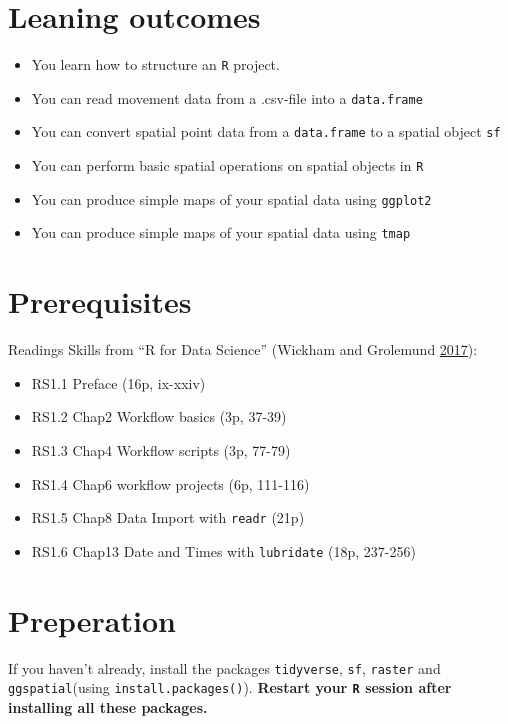 \documentclass[]{book}
\providecommand{\tightlist}{%
  \setlength{\itemsep}{0pt}\setlength{\parskip}{0pt}}
\begin{document}
\hypertarget{leaning-outcomes}{%
\section{Leaning outcomes}\label{leaning-outcomes}}

\begin{itemize}
\tightlist
\item
  You learn how to structure an \texttt{R} project.
\item
  You can read movement data from a .csv-file into a \texttt{data.frame}
\item
  You can convert spatial point data from a \texttt{data.frame} to a spatial object \texttt{sf}
\item
  You can perform basic spatial operations on spatial objects in \texttt{R}
\item
  You can produce simple maps of your spatial data using \texttt{ggplot2}
\item
  You can produce simple maps of your spatial data using \texttt{tmap}
\end{itemize}

\hypertarget{prerequisites}{%
\section{Prerequisites}\label{prerequisites}}

Readings Skills from ``R for Data Science'' (Wickham and Grolemund \protect\hyperlink{ref-wickham2017}{2017}):

\begin{itemize}
\tightlist
\item
  RS1.1 Preface (16p, ix-xxiv)
\item
  RS1.2 Chap2 Workflow basics (3p, 37-39)
\item
  RS1.3 Chap4 Workflow scripts (3p, 77-79)
\item
  RS1.4 Chap6 workflow projects (6p, 111-116)
\item
  RS1.5 Chap8 Data Import with \texttt{readr} (21p)
\item
  RS1.6 Chap13 Date and Times with \texttt{lubridate} (18p, 237-256)
\end{itemize}

\hypertarget{preperation}{%
\section{Preperation}\label{preperation}}

If you haven't already, install the packages \texttt{tidyverse}, \texttt{sf}, \texttt{raster} and \texttt{ggspatial}(using \texttt{install.packages()}). \textbf{Restart your \texttt{R} session after installing all these packages.}
\end{document}
